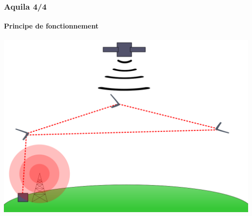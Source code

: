 \documentclass{beamer}
\begin{document}
\begin{frame}
  \frametitle{Aquila 4/4}
  \framesubtitle{Principe de fonctionnement}
  \includegraphics[width=\textwidth]{../Images/schema_aquila.png}
\end{frame}
\end{document}
